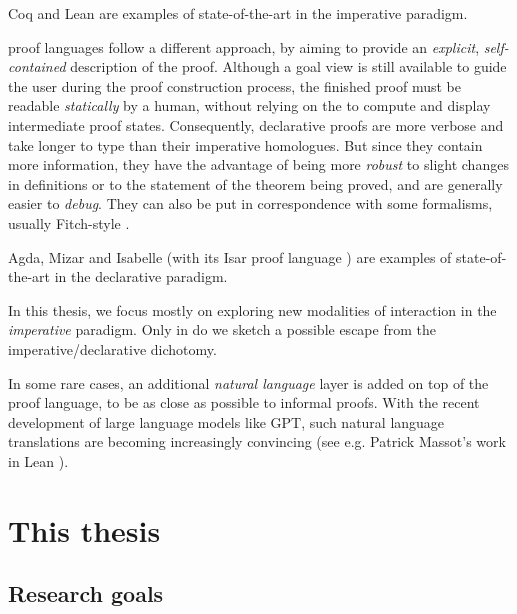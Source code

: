 \begin{description}[labelsep=0pt]
  Coq and Lean are examples of state-of-the-art  in the
  imperative paradigm.
  
  \item[Declarative~]proof languages follow a different approach, by
  aiming to provide an \emph{explicit}, \emph{self-contained} description of the
  proof. Although a goal view is still available to guide the user during the
  proof construction process, the finished proof must be readable
  \emph{statically} by a human, without relying on the  to compute and
  display intermediate proof states. Consequently, declarative proofs are more
  verbose and take longer to type than their imperative homologues. But since
  they contain more information, they have the advantage of being more
  \emph{robust} to slight changes in definitions or to the statement of the
  theorem being proved, and are generally easier to \emph{debug}. They can also
  be put in correspondence with some  formalisms, usually
  Fitch-style  \cite{geuvers_proof_2009}.
  
  Agda, Mizar and Isabelle (with its Isar proof language ) are
  examples of state-of-the-art  in the declarative paradigm.
\end{description}

\begin{emphpar}
  In this thesis, we focus mostly on exploring new modalities of interaction in
  the \emph{imperative} paradigm. Only in  do we
  sketch a possible escape from the imperative/declarative dichotomy.
\end{emphpar}

\begin{remark}
In some rare cases, an additional \emph{natural language} layer is added on top
of the proof language, to be as close as possible to informal proofs. With the
recent development of large language models like GPT, such natural language
translations are becoming increasingly convincing (see e.g. Patrick Massot's
work in Lean \cite{LeanIPAM}).
\end{remark}


\section{This thesis}

\subsection{Research goals}

